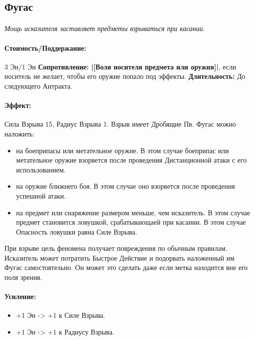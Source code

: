 \subsection{Фугас}
\paragraph{} 
\textit{Мощь исказителя заставляет предметы взрываться при касании.}
\paragraph{Стоимость/Поддержание: }3 Эн/1 Эн
\newline
\textbf{Сопротивление: }
\textbf{|[Воля носителя предмета или оружия]|}, если носитель не желает, чтобы его оружие попало под эффекты.
\newline 
\textbf{Длительность: }До следующего Антракта.
\paragraph{Эффект: }Сила Взрыва 15, Радиус Взрыва 1. Взрыв имеет Дробящие Пв. 
\newline Фугас можно наложить: 
\begin{itemize} 
\item на боеприпасы или метательное оружие. В этом случае боеприпас или метательное оружие взорвется после проведения Дистанционной атаки с его использованием. 
\item на оружие ближнего боя. В этом случае оно взорвется после проведения успешной атаки. 
\item на предмет или снаряжение размером меньше, чем исказитель. В этом случае предмет становится ловушкой, срабатывающаей при касании. В этом случае Опасность ловушки равна Силе Взрыва. 
\end{itemize} При взрыве цель феномена получает повреждения по обычным правилам. 
\newline Исказитель может потратить Быстрое Действие и подорвать наложенный им Фугас самостоятельно. Он может это сделать даже если метка находится вне его поля зрения.
\paragraph{Усиление:}
\begin{itemize}
\item+1 Эн -> +1 к Силе Взрыва.
\item+1 Эн -> +1 к Радиусу Взрыва.
\end{itemize}

